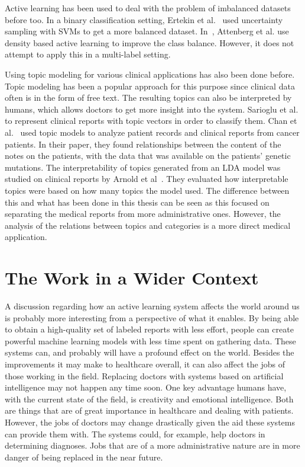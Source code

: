 Active learning has been used to deal with the problem of imbalanced datasets before too.
In a binary classification setting, Ertekin et al\@.~\cite{ertekin2007learning} used uncertainty sampling with SVMs to get a more balanced dataset.
In~\cite{attenberg2013class}, Attenberg et al\@. use density based active learning to improve the class balance.
However, it does not attempt to apply this in a multi-label setting.

Using topic modeling for various clinical applications has also been done before.
Topic modeling has been a popular approach for this purpose since clinical data often is in the form of free text.
The resulting topics can also be interpreted by humans, which allows doctors to get more insight into the system.
Sarioglu et al\@.~\cite{sarioglu2013topic} to represent clinical reports with topic vectors in order to classify them.
Chan et al\@.~\cite{chan2013empirical} used topic models to analyze patient records and clinical reports from cancer patients.
In their paper, they found relationships between the content of the notes on the patients, with the data that was available on the patients' genetic mutations.
The interpretability of topics generated from an LDA model was studied on clinical reports by Arnold et al~\cite{arnold2016evaluating}.
They evaluated how interpretable topics were based on how many topics the model used.
The difference between this and what has been done in this thesis can be seen as this focused on separating the medical reports from more administrative ones.
However, the analysis of the relations between topics and categories is a more direct medical application.


\section{The Work in a Wider Context}

A discussion regarding how an active learning system affects the world around us is probably more interesting from a perspective of what it enables.
By being able to obtain a high-quality set of labeled reports with less effort, people can create powerful machine learning models with less time spent on gathering data.
These systems can, and probably will have a profound effect on the world.
Besides the improvements it may make to healthcare overall, it can also affect the jobs of those working in the field.
Replacing doctors with systems based on artificial intelligence may not happen any time soon.
One key advantage humans have, with the current state of the field, is creativity and emotional intelligence.
Both are things that are of great importance in healthcare and dealing with patients.
However, the jobs of doctors may change drastically given the aid these systems can provide them with.
The systems could, for example, help doctors in determining diagnoses.
Jobs that are of a more administrative nature are in more danger of being replaced in the near future.

